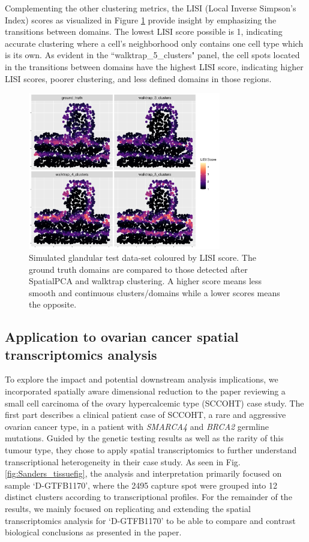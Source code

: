 \documentclass{article}
\begin{document}
Complementing the other clustering metrics, the LISI (Local Inverse Simpson's Index) scores as visualized in Figure \ref{fig:lisiplot} provide insight by emphasizing the transitions between domains. The lowest LISI score possible is 1, indicating accurate clustering where a cell's neighborhood only contains one cell type which is its own. As evident in the ``walktrap\_5\_clusters" panel, the cell spots located in the transitions between domains have the highest LISI score, indicating higher LISI scores, poorer clustering, and less defined domains in those regions.

\begin{figure}[h!]
    \centering
    \includegraphics[width=0.75\textwidth]{images/LISI_plot.png}
    \caption{Simulated glandular test data-set coloured by LISI score. The ground truth domains are compared to those detected after SpatialPCA and walktrap clustering. A higher score means less smooth and continuous clusters/domains while a lower scores means the opposite.}
    \label{fig:lisiplot}
\end{figure}

\subsection*{Application to ovarian cancer spatial transcriptomics analysis}

To explore the impact and potential downstream analysis implications, we incorporated spatially aware dimensional reduction to the \citet{sanders_small_2022} paper reviewing a small cell carcinoma of the ovary hypercalcemic type (SCCOHT) case study. The first part describes a clinical patient case of SCCOHT, a rare and aggressive ovarian cancer type, in a patient with \textit{SMARCA4} and \textit{BRCA2} germline mutations. Guided by the genetic testing results as well as the rarity of this tumour type, they chose to apply spatial transcriptomics to further understand transcriptional heterogeneity in their case study. As seen in Fig. \ref{fig:Sanders_tissuefig}, the \citet{sanders_small_2022} analysis and interpretation primarily focused on sample `D-GTFB1170', where the 2495 capture spot were grouped into 12 distinct clusters according to transcriptional profiles. For the remainder of the results, we mainly focused on replicating and extending the spatial transcriptomics analysis for `D-GTFB1170' to be able to compare and contrast biological conclusions as presented in the paper.
\end{document}
